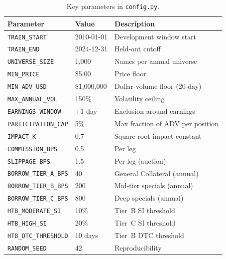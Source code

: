 \documentclass[12pt,a4paper]{article}
\begin{document}
\begin{table}[H]
\centering
\caption{Key parameters in \texttt{config.py}.}
\label{tab:config}
\begin{tabular}{lll}
\toprule
Parameter & Value & Description \\
\midrule
\texttt{TRAIN\_START}         & 2010-01-01    & Development window start \\
\texttt{TRAIN\_END}           & 2024-12-31    & Held-out cutoff \\
\texttt{UNIVERSE\_SIZE}       & 1,000         & Names per annual universe \\
\texttt{MIN\_PRICE}           & \$5.00        & Price floor \\
\texttt{MIN\_ADV\_USD}        & \$1,000,000   & Dollar-volume floor (20-day) \\
\texttt{MAX\_ANNUAL\_VOL}     & 150\%         & Volatility ceiling \\
\texttt{EARNINGS\_WINDOW}     & $\pm$1 day    & Exclusion around earnings \\
\texttt{PARTICIPATION\_CAP}   & 5\%           & Max fraction of ADV per position \\
\texttt{IMPACT\_K}            & 0.7           & Square-root impact constant \\
\texttt{COMMISSION\_BPS}      & 0.5           & Per leg \\
\texttt{SLIPPAGE\_BPS}        & 1.5           & Per leg (auction) \\
\texttt{BORROW\_TIER\_A\_BPS} & 40            & General Collateral (annual) \\
\texttt{BORROW\_TIER\_B\_BPS} & 200           & Mid-tier specials (annual) \\
\texttt{BORROW\_TIER\_C\_BPS} & 800           & Deep specials (annual) \\
\texttt{HTB\_MODERATE\_SI}    & 10\%          & Tier~B SI threshold \\
\texttt{HTB\_HIGH\_SI}        & 20\%          & Tier~C SI threshold \\
\texttt{HTB\_DTC\_THRESHOLD}  & 10 days       & Tier~B DTC threshold \\
\texttt{RANDOM\_SEED}         & 42            & Reproducibility \\
\bottomrule
\end{tabular}
\end{table}
\end{document}
